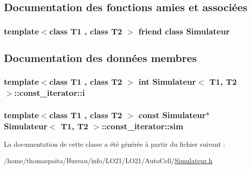\subsection{Documentation des fonctions amies et associées}
\subsubsection[{\texorpdfstring{Simulateur}{Simulateur}}]{\setlength{\rightskip}{0pt plus 5cm}template$<$class T1 , class T2 $>$ friend class {\bf Simulateur}\hspace{0.3cm}{\ttfamily [friend]}}\hypertarget{class_simulateur_1_1const__iterator_ae6c3966e699bf920c86e0bd006bd8183}{}\label{class_simulateur_1_1const__iterator_ae6c3966e699bf920c86e0bd006bd8183}


\subsection{Documentation des données membres}
\subsubsection[{\texorpdfstring{i}{i}}]{\setlength{\rightskip}{0pt plus 5cm}template$<$class T1 , class T2 $>$ int {\bf Simulateur}$<$ T1, T2 $>$\+::const\+\_\+iterator\+::i\hspace{0.3cm}{\ttfamily [private]}}\hypertarget{class_simulateur_1_1const__iterator_aa4b2261e7087b7c68391c893aa531973}{}\label{class_simulateur_1_1const__iterator_aa4b2261e7087b7c68391c893aa531973}
\subsubsection[{\texorpdfstring{sim}{sim}}]{\setlength{\rightskip}{0pt plus 5cm}template$<$class T1 , class T2 $>$ const {\bf Simulateur}$\ast$ {\bf Simulateur}$<$ T1, T2 $>$\+::const\+\_\+iterator\+::sim\hspace{0.3cm}{\ttfamily [private]}}\hypertarget{class_simulateur_1_1const__iterator_af879bec3ae8b71f1c81826e0c1b24077}{}\label{class_simulateur_1_1const__iterator_af879bec3ae8b71f1c81826e0c1b24077}


La documentation de cette classe a été générée à partir du fichier suivant \+:\begin{DoxyCompactItemize}
\item 
/home/thomaspaita/\+Bureau/info/\+L\+O21/\+L\+O21/\+Auto\+Cell/\hyperlink{_simulateur_8h}{Simulateur.\+h}\end{DoxyCompactItemize}

